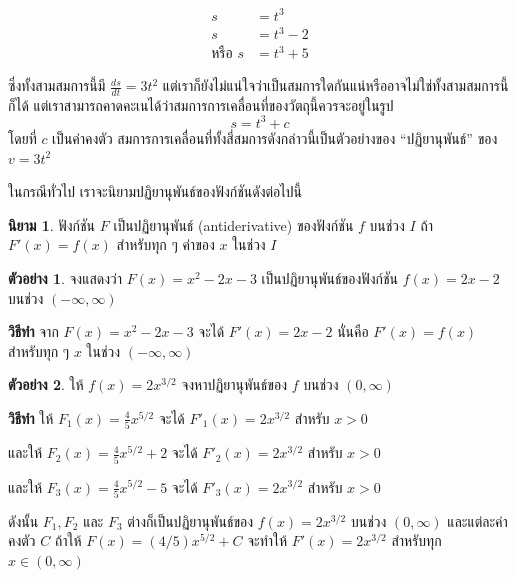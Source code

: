 \documentclass[
]{book}
\theoremstyle{definition}
\newtheorem{definition}{นิยาม}[chapter]
\theoremstyle{definition}
\newtheorem{example}{ตัวอย่าง}[chapter]
\theoremstyle{definition}
\theoremstyle{definition}
\theoremstyle{remark}
\begin{document}
\begin{equation}
\begin{aligned}
    s &= t^3 \\ 
    s &= t^3 -2 \\
    \text{หรือ  } s &= t^3 + 5
\end{aligned}
\end{equation}

ซึ่งทั้งสามสมการนี้มี \(\displaystyle  \frac{ds}{dt}= 3t^2\)
แต่เราก็ยังไม่แน่ใจว่าเป็นสมการใดกันแน่หรืออาจไม่ใช่ทั้งสามสมการนี้ก็ได้
แต่เราสามารถคาดคะเนได้ว่าสมการการเคลื่อนที่ของวัตถุนี้ควรจะอยู่ในรูป \[s = t^{3} + c\]
โดยที่ \(c\) เป็นค่าคงตัว สมการการเคลื่อนที่ทั้งสี่สมการดังกล่าวนี้เป็นตัวอย่างของ ``ปฏิยานุพันธ์''
ของ \(v = 3t^{2}\)

ในกรณีทั่วไป เราจะนิยามปฏิยานุพันธ์ของฟังก์ชันดังต่อไปนี้

\begin{definition}
ฟังก์ชัน \(F\) เป็นปฏิยานุพันธ์ (antiderivative) ของฟังก์ชัน \(f\) บนช่วง \(I\) ถ้า
\(F'(x) = f(x)\) สำหรับทุก ๆ ค่าของ \(x\) ในช่วง \(I\)
\end{definition}

\begin{example}
จงแสดงว่า \(F(x) = x^{2}-2x- 3\) เป็นปฏิยานุพันธ์ของฟังก์ชัน \(f(x)=2x-2\) บนช่วง
\(\left( {-\infty ,\infty } \right)\)
\end{example}

\textbf{วิธีทำ} จาก \(F(x) = x^{2} - 2x - 3\) จะได้ \(F'(x)
= 2x - 2\) นั่นคือ \(F'(x) = f(x)\) สำหรับทุก ๆ \(x\) ในช่วง \(\left( {-\infty
,\infty } \right)\)

\begin{example}
ให้ \(f(x) = 2x^{3/2}\) จงหาปฏิยานุพันธ์ของ \(f\) บนช่วง
\(\left( {0 ,\infty } \right)\)
\end{example}

\textbf{วิธีทำ} ให้ \(\displaystyle F_{1}(x) = \frac{4}{5} x^{5/2}\) จะได้
\(F'_1(x) = 2x^{3/2}\) สำหรับ \(x > 0\)

และให้ \(\displaystyle F_{2}(x) = \frac{4}{5} x^{5/2} + 2\) จะได้
\(F'_2(x) = 2x^{3/2}\) สำหรับ \(x > 0\)

และให้ \(\displaystyle F_{3}(x) = \frac{4}{5} x^{5/2} - 5\) จะได้
\(F'_3(x) = 2x^{3/2}\) สำหรับ \(x > 0\)

ดังนั้น \(F_1,F_2\) และ \(F_3\) ต่างก็เป็นปฏิยานุพันธ์ของ \(f(x) = 2x^{3/2}\) บนช่วง
\(\left( {0 ,\infty } \right)\) และแต่ละค่าคงตัว \(C\) ถ้าให้
\(F(x) =(4/5)x^{5/2} + C\) จะทำให้ \(F'(x) = 2x^{3/2}\) สำหรับทุก
\(x \in \left( 0 ,\infty  \right)\)
\end{document}
